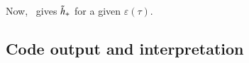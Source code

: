     Now,~ gives $\tilde{h}_+$ for a given $\varepsilon(\tau)$. %
    
   









\subsection{Code output and interpretation}\label{sec:PT:gwas:data_comparison}

